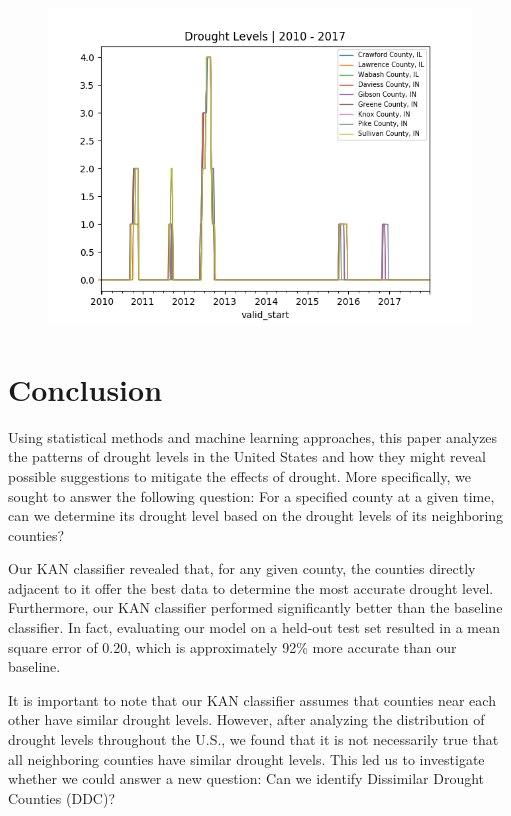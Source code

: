 \documentclass{article}
\begin{document}
\begin{figure}[hbt!]
    \centering
    \includegraphics[width = 0.8 \textwidth]{min_dist_group07.png}
    \caption{}
    \label{fig:min_dist_group07}
\end{figure}

\clearpage

\section{Conclusion}
Using statistical methods and machine learning approaches, this paper analyzes the patterns of drought levels in the United States and how they might reveal possible suggestions to mitigate the effects of drought. More specifically, we sought to answer the following question: For a specified county at a given time, can we determine its drought level based on the drought levels of its neighboring counties?

Our KAN classifier revealed that, for any given county, the counties directly adjacent to it offer the best data to determine the most accurate drought level. Furthermore, our KAN classifier performed significantly better than the baseline classifier. In fact, evaluating our model on a held-out test set resulted in a mean square error of 0.20, which is approximately 92\% more accurate than our baseline.

It is important to note that our KAN classifier assumes that counties near each other have similar drought levels. However, after analyzing the distribution of drought levels throughout the U.S., we found that it is not necessarily true that all neighboring counties have similar drought levels. This led us to investigate whether we could answer a new question: Can we identify Dissimilar Drought Counties (DDC)?
\end{document}
